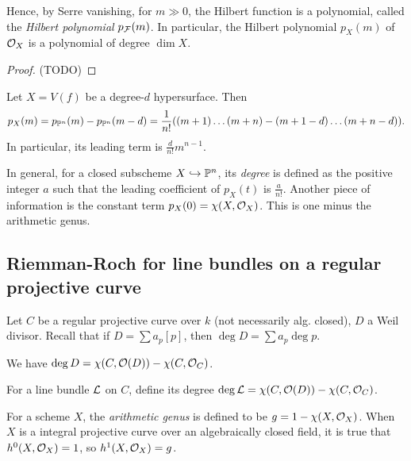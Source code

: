 \documentclass[11pt]{amsart}
\begin{document}
Hence, by Serre vanishing, for $m\gg 0$, the Hilbert function is a polynomial, called the \emph{Hilbert polynomial} $p_{\mathcal{F}}(m)$. In particular, the Hilbert polynomial $p_X(m)$ of $\mathcal{O}_X$ is a polynomial of degree $\dim X$.


\begin{proof}
    (TODO)
\end{proof}

\begin{exm}
    Let $X = V(f)$ be a degree-$d$ hypersurface. Then 
    \[p_X(m) = p_{\mathbb{P}^n}(m) - p_{\mathbb{P}^n}(m-d) = \frac{1}{n!}((m+1)\dots(m+n) - (m+1-d)\dots(m+n-d)).\]
    In particular, its leading term is $\frac{d}{n!}m^{n-1}$.
\end{exm}

\begin{Rem}
In general, for a closed subscheme $X\hookrightarrow \mathbb{P}^n$, its \emph{degree} is defined as the positive integer $a$ such that the leading coefficient of $p_X(t)$ is $\frac{a}{n!}$. Another piece of information is the constant term $p_X(0) = \chi(X, \mathcal{O}_X)$. This is one minus the arithmetic genus.
\end{Rem}




\subsection{Riemman-Roch for line bundles on a regular projective curve}

Let $C$ be a regular projective curve over $k$ (not necessarily alg. closed), $D$ a Weil divisor. Recall that if $D = \sum a_p [p]$, then $\deg D = \sum a_p \deg p$.

\begin{thm}
    We have $\deg D = \chi(C, \mathcal{O}(D)) - \chi(C, \mathcal{O}_C)$.
\end{thm}

\begin{defn}
    For a line bundle $\mathcal{L}$ on $C$, define its degree $\deg \mathcal{L} = \chi(C, \mathcal{O}(D)) - \chi(C, \mathcal{O}_C)$. 
\end{defn}


\begin{defn}
    For a scheme $X$, the \emph{arithmetic genus} is defined to be $g = 1 - \chi(X,\mathcal{O}_X)$. When $X$ is a integral projective curve over an algebraically closed field, it is true that $h^0(X,\mathcal{O}_X) = 1$, so $h^1(X,\mathcal{O}_X) = g$. 
\end{defn}
\end{document}
